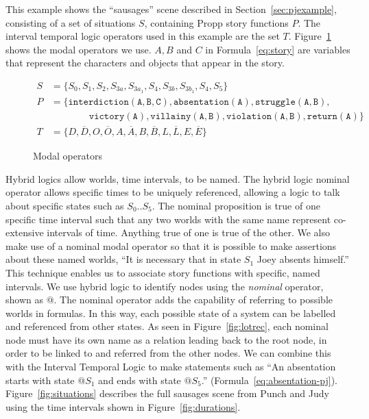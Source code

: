 \documentclass[11pt]{report}
\begin{document}
This example shows the ``sausages'' scene described in Section~\ref{sec:pjexample}, consisting of a set of situations $S$, containing Propp story functions $P$. The interval temporal logic operators used in this example are the set $T$. Figure~\ref{fig:operators} shows the modal operators we use. $A, B$ and $C$ in Formula~\ref{eq:story} are variables that represent the characters and objects that appear in the story.
\begin{figure}[!t]
\begin{align}
    S &= \{S_0, S_1, S_2, S_{3a}, S_{3a_1}, S_4, S_{3b}, S_{3b_1}, S_4, S_5\}\\
    P &= \{\mathtt{interdiction(A, B, C), absentation(A), struggle(A, B),}\nonumber\\
  &\qquad\qquad\mathtt{victory(A), villainy(A, B), violation(A, B), return(A)}\}\label{eq:story}\\
  T &= \{D, \overline{D}, O, \overline{O}, A, \overline{A}, B, \overline{B}, L, \overline{L}, E, \overline{E}\}
\end{align}
\caption{Modal operators}\label{fig:operators}
\end{figure}
Hybrid logics allow worlds, time intervals, to be named. The hybrid logic nominal operator allows specific times to be uniquely referenced, allowing a logic to talk about specific states such as $S_0..S_5$. The nominal proposition is true of one specific time interval such that any two worlds with the same name represent co-extensive intervals of time. Anything true of one is true of the other.
We also make use of a nominal modal operator so that it is possible to make assertions about these named worlds, ``It is necessary that in state $S_1$ Joey absents himself.'' This technique enables us to associate story functions with specific, named intervals.
We use hybrid logic to identify nodes using the \emph{nominal} operator, shown as $@$. The nominal operator adds the capability of referring to possible worlds in formulas. In this way, each possible state of a system can be labelled and referenced from other states. As seen in Figure~\ref{fig:lotrec}, each nominal node must have its own name as a relation leading back to the root node, in order to be linked to and referred from the other nodes.
We can combine this with the Interval Temporal Logic to make statements such as ``An absentation starts with state $@S_1$ and ends with state $@S_5$.'' (Formula~\ref{eq:absentation-pj}).
Figure~\ref{fig:situations} describes the full sausages scene from Punch and Judy using the time intervals shown in Figure~\ref{fig:durations}.
\end{document}
